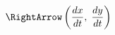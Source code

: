 \documentclass[preview]{standalone}
\begin{document}
\begin{align*}
\RightArrow \left( \frac{dx}{dt}, \;  \frac{dy}{dt} \right)
\end{align*}
\end{document}
